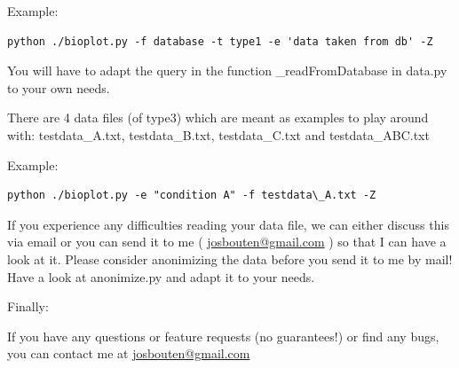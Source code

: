 \documentclass[letterpaper,10pt,english]{sphinxmanual}
\begin{document}
Example:

\begin{Verbatim}[commandchars=\\\{\}]
python ./bioplot.py -f database -t type1 -e 'data taken from db' -Z
\end{Verbatim}

You will have to adapt the query in the function \_readFromDatabase in data.py to your own needs.

There are 4 data files (of type3) which are meant as examples to play around
with: testdata\_A.txt, testdata\_B.txt, testdata\_C.txt and testdata\_ABC.txt

Example:

\begin{Verbatim}[commandchars=\\\{\}]
python ./bioplot.py -e "condition A" -f testdata\_A.txt -Z
\end{Verbatim}

If you experience any difficulties reading your data file, we can either discuss this
via email or you can send it to me ( \href{mailto:josbouten@gmail.com}{josbouten@gmail.com} ) so that I can have a look at it.
Please consider anonimizing the data before you send it to me by mail! Have a look at
anonimize.py and adapt it to your needs.

Finally:

If you have any questions or feature requests (no guarantees!) or find any bugs,
you can contact me at \href{mailto:josbouten@gmail.com}{josbouten@gmail.com}



\renewcommand{\indexname}{Index}
\printindex
\end{document}
